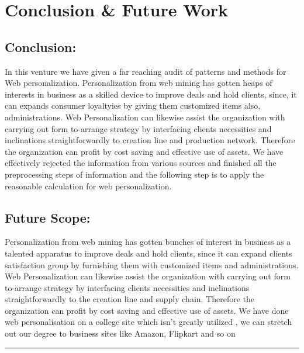 \newpage
\chapter{Conclusion \& Future Work}
\section{Conclusion:}
In this venture we have given a far reaching audit of patterns and methods for Web
personalization. Personalization from web mining has gotten heaps of interests in business
as a skilled device to improve deals and hold clients, since, it can expands consumer loyaltyies
by giving them customized items also, administrations. Web Personalization can likewise
assist the organization with carrying out form to-arrange strategy by interfacing clients
necessities and inclinations straightforwardly to creation line and production network.
Therefore the organization can profit by cost saving and effective use of assets. We have
effectively rejected the information from various sources and finished all the preprocessing
steps of information and the following step is to apply the reasonable calculation for web
personalization.
\section{Future Scope:}
Personalization from web mining has gotten bunches of interest in business as a talented
apparatus to improve deals and hold clients, since it can expand clients satisfaction group
by furnishing them with customized items and administrations. Web Personalization can
likewise assist the organization with carrying out form to-arrange strategy by interfacing
clients necessities and inclinations straightforwardly to the creation line and supply chain.
Therefore the organization can profit by cost saving and effective use of assets. We have
done web personalisation on a college site which isn't greatly utilized , we can stretch out
our degree to business sites like Amazon, Flipkart and so on


\vspace{10mm}
\hrule
